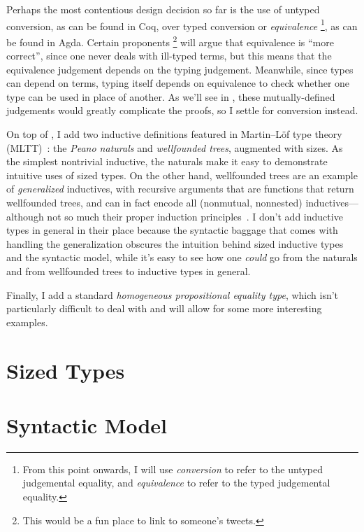 Perhaps the most contentious design decision so far is the use of untyped conversion,
as can be found in Coq, over typed conversion or \emph{equivalence}%
\footnote{From this point onwards, I will use \emph{conversion}
to refer to the untyped judgemental equality,
and \emph{equivalence} to refer to the typed judgemental equality.},
as can be found in Agda.
Certain proponents%
\footnote{This would be a fun place to link to someone's tweets.}
will argue that equivalence is ``more correct'',
since one never deals with ill-typed terms,
but this means that the equivalence judgement depends on the typing judgement.
Meanwhile, since types can depend on terms,
typing itself depends on equivalence to check whether one type can be used in place of another.
As we'll see in \TODO, these mutually-defined judgements would greatly complicate the proofs,
so I settle for conversion instead.

On top of \GCC, I add two inductive definitions featured in Martin--L\"of type theory (MLTT)~\citep{mltt}:
the \emph{Peano naturals} and \emph{wellfounded trees}, augmented with sizes.
As the simplest nontrivial inductive,
the naturals make it easy to demonstrate intuitive uses of sized types.
On the other hand, wellfounded trees are an example of \emph{generalized} inductives,
with recursive arguments that are functions that return wellfounded trees,
and can in fact encode all (nonmutual, nonnested) inductives---%
although not so much their proper induction principles~\citep{w-types}.
I don't add inductive types in general in their place
because the syntactic baggage that comes with handling the generalization
obscures the intuition behind sized inductive types and the syntactic model,
while it's easy to see how one \emph{could} go from the naturals and from wellfounded trees
to inductive types in general.

Finally, I add a standard \emph{homogeneous propositional equality type},
which isn't particularly difficult to deal with
and will allow for some more interesting examples.

\section{Sized Types}

\section{Syntactic Model}